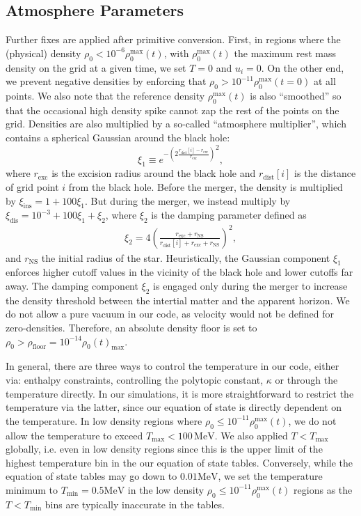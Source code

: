 \subsection*{Atmosphere Parameters}

Further fixes are applied after primitive conversion.  First, in regions where the (physical) density $\rho_0 < 10^{-6} \rho_0^\textrm{max}(t)$, with $\rho_0^\textrm{max}(t)$ the maximum rest mass density on the grid at a given time, we set $T=0$ and $u_i=0$.  On the other end, we prevent negative densities by enforcing that $\rho_0 > 10^{-11} \rho_0^\textrm{max}(t=0)$ at all points.  We also note that the reference density $\rho_0^\textrm{max}(t)$ is also ``smoothed'' so that the occasional high density spike cannot zap the rest of the points on the grid.  Densities are also multiplied by a so-called ``atmosphere multiplier'', which contains a spherical Gaussian around the black hole:
\begin{equation}
\xi_1 \equiv {e^{- \left(2 \frac{ r_\textrm{dist}[i] - r_\textrm{exc}}{r_\textrm{exc}}\right)}}^2 ,
\end{equation}
where $r_\textrm{exc}$ is the excision radius around the black hole and $ r_\textrm{dist}[i]$ is the distance of grid point $i$ from the black hole.
Before the merger, the density is multiplied by $\xi_\textrm{ins} = 1 + 100 \xi_1$.  But during the merger, we instead multiply by $\xi_\textrm{dis}  = 10^{-3} + 100 \xi_1 + \xi_2$, where $\xi_2$ is the damping parameter defined as
\begin{eqnarray}
\xi_2 = 4 \left( \frac{r_\textrm{exc} + r_\textrm{NS}}
{ r_\textrm{dist}[i] + r_\textrm{exc} + r_\textrm{NS}}\right)^2 , 
\end{eqnarray}
and $ r_\textrm{NS}$ the initial radius of the star.
Heuristically, the Gaussian component $\xi_1$ enforces higher cutoff values in the vicinity of the black hole and lower cutoffs far away.
The damping component $\xi_2$ is engaged only during the merger to increase the density threshold between the intertial matter and the apparent horizon.
We do not allow a pure vacuum in our code, as velocity would not be defined for zero-densities.  Therefore, an absolute density floor is set to $\rho_0 >  \rho_\textrm{floor} = 10^{-14} \rho_0(t)_\textrm{max}$.  

In general, there are three ways to control the temperature in our code, either via: enthalpy constraints, controlling the polytopic constant, $\kappa$ or through the temperature directly.  In our simulations, it is more straightforward to restrict the temperature via the latter, since our equation of state is directly dependent on the temperature.  In low density regions where $\rho_0 \le 10^{-11} \rho_0^\textrm{max}(t)$, we do not allow the temperature to exceed $T_\textrm{max} < 100\,\textrm{MeV}$.  We also applied $T < T_\textrm{max}$ globally, i.e. even in low density regions since this is the upper limit of the highest temperature bin in the our equation of state tables.  
Conversely, while the equation of state tables may go down to $0.01 \textrm{MeV}$, we set the temperature minimum to $T_\textrm{min} = 0.5 \textrm{MeV}$ in the low density $\rho_0 \le 10^{-11} \rho_0^\textrm{max}(t)$ regions as the $T < T_\textrm{min}$ bins are typically inaccurate in the tables.

